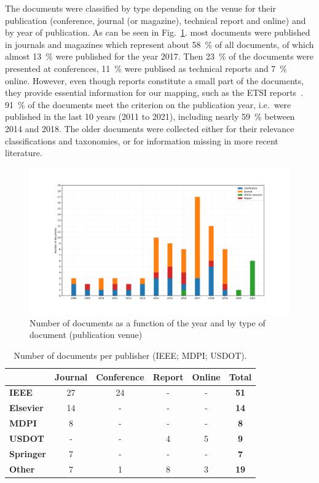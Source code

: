 The documents were classified by type depending on the venue for their publication (conference, journal (or magazine), technical report and online) and by year of publication. As can be seen in Fig.~\ref{fig:type_of_article}. 
most documents were published in journals and magazines which represent about 58~\% of all documents, of which almost 13~\% were published for the year 2017. Then 23~\% of the documents were presented at conferences, 11~\% were publised as technical reports and 7~\% online. However, even though reports constitute a small part of the documents, they provide essential information for our mapping, such as the \acrshort{ETSI} reports~\cite{etsi_etsi_tr_102_638_intelligent_2009,etsi_tr_102_863_intelligent_2011}.
91~\% of the documents meet the criterion on the publication year, i.e.\ were published in the last 10 years (2011 to 2021), including nearly 59~\% between 2014 and 2018. The older documents were collected either for their relevance classifications and taxonomies, or for information missing in more recent literature. 

\begin{figure}[ht!]
  \begin{center}
    \includegraphics[width=15cm]{document_type.pdf}
    \caption{Number of documents as a function of the year and by type of document (publication venue)}
    \label{fig:type_of_article}
\end{center}
\end{figure}


\begin{table}[ht!]
\centering
\begin{tabular}[ht!]{p{}ccccc}
\hline
&Journal&Conference&Report&Online&\bf{Total}\\
\hline
\bf{IEEE}&27&24&-&-&\bf{51}\\
\bf{Elsevier}&14&-&-&-&\bf{14}\\
\bf{MDPI}&8&-&-&-&\bf{8}\\
\bf{USDOT}&-&-&4&5&\bf{9}\\
\bf{Springer}&7&-&-&-&\bf{7}\\
\bf{Other}&7&1&8&3&\bf{19}\\
\hline
\end{tabular}
\caption{Number of documents per publisher (\acrfull{IEEE}; \acrfull{MDPI}; \acrfull{USDOT}). }
\label{tab:publisher}
\end{table}

